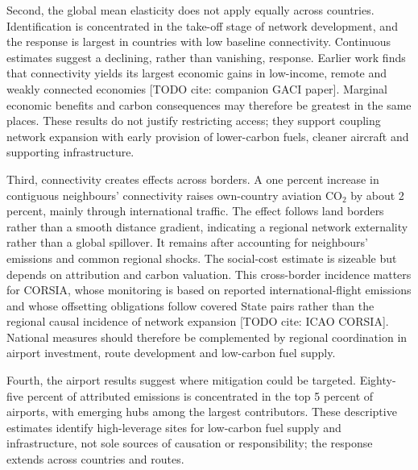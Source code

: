 \documentclass[12pt]{extarticle}
\begin{document}
Second, the global mean elasticity does not apply equally across countries. Identification is concentrated in the take-off stage of network development, and the response is largest in countries with low baseline connectivity. Continuous estimates suggest a declining, rather than vanishing, response. Earlier work finds that connectivity yields its largest economic gains in low-income, remote and weakly connected economies [TODO cite: companion GACI paper]. Marginal economic benefits and carbon consequences may therefore be greatest in the same places. These results do not justify restricting access; they support coupling network expansion with early provision of lower-carbon fuels, cleaner aircraft and supporting infrastructure.

Third, connectivity creates effects across borders. A one percent increase in contiguous neighbours' connectivity raises own-country aviation CO$_2$ by about 2 percent, mainly through international traffic. The effect follows land borders rather than a smooth distance gradient, indicating a regional network externality rather than a global spillover. It remains after accounting for neighbours' emissions and common regional shocks.  The social-cost estimate is sizeable but depends on attribution and carbon valuation. This cross-border incidence matters for CORSIA, whose monitoring is based on reported international-flight emissions and whose offsetting obligations follow covered State pairs rather than the regional causal incidence of network expansion [TODO cite: ICAO CORSIA]. National measures should therefore be complemented by regional coordination in airport investment, route development and low-carbon fuel supply.

Fourth, the airport results suggest where mitigation could be targeted. Eighty-five percent of attributed emissions is concentrated in the top 5 percent of airports, with emerging hubs among the largest contributors. These descriptive estimates identify high-leverage sites for low-carbon fuel supply and infrastructure, not sole sources of causation or responsibility; the response extends across countries and routes.
\end{document}
